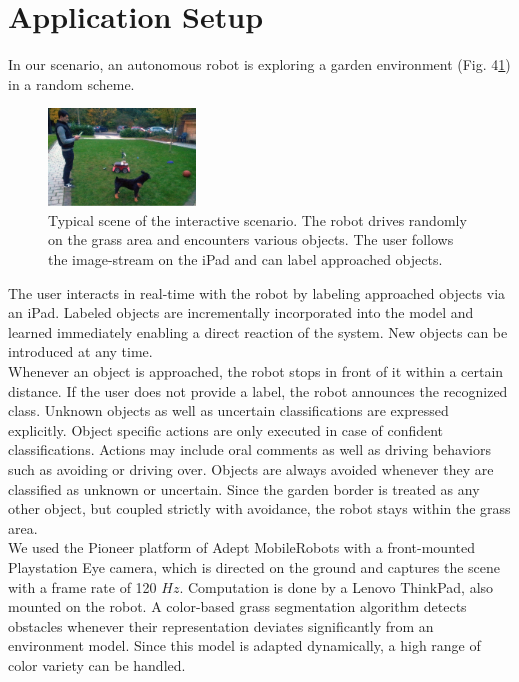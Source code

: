 \documentclass[conference]{IEEEtran}
\begin{document}
\section{Application Setup}
In our scenario, an autonomous robot is exploring a garden environment (Fig. 4\ref{outdoorScenario}) in a random scheme.
\begin{figure}
\centering
\includegraphics[width=0.35\textwidth]{Images/General/Scenario.jpg}
\caption{Typical scene of the interactive scenario. The robot drives randomly on the grass area and encounters various objects. The 
user follows the image-stream on the iPad and can label approached objects.}
\label{outdoorScenario}
\end{figure}
The user interacts in real-time with the robot by labeling approached objects via an iPad. 
Labeled objects are incrementally incorporated into the model and learned immediately enabling a direct reaction of the system.
New objects can be introduced at any time.\\
Whenever an object is approached, the robot stops in front of it within a certain distance. If the user does not provide a label, the robot announces the recognized class.
Unknown objects as well as uncertain classifications are expressed explicitly. 
Object specific actions are only executed in case of confident classifications. Actions may include oral comments as well as driving behaviors such as 
avoiding or driving over. Objects are always avoided whenever they are classified as unknown or uncertain. 
Since the garden border is treated as any other object, but coupled strictly with avoidance, the robot stays within the grass area.\\
We used the Pioneer platform of Adept Mobile\-Robots with a front-mounted Playstation Eye camera, which is directed on the 
ground and captures the scene with a frame rate of 120 $Hz$.
Computation is done by a Lenovo ThinkPad, also mounted on the robot.
A color-based grass segmentation algorithm detects obstacles whenever their representation
deviates significantly from an environment model. Since this model is adapted dynamically, a high range of color variety can be handled.
\end{document}
